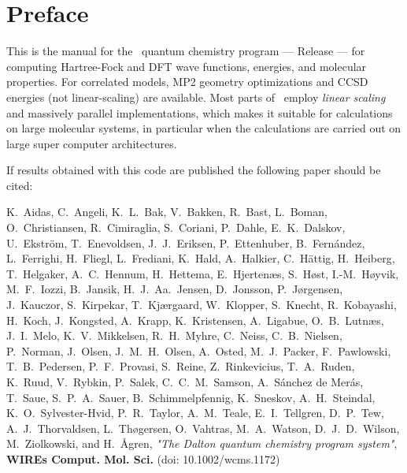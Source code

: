 
\chapter*{Preface}

This is the manual for the \lsdalton\ quantum chemistry program
--- Release {\latestrelease} --- for computing Hartree-Fock and DFT
wave functions, energies, and molecular properties.
For correlated models, 
MP2 geometry optimizations and CCSD energies (not linear-scaling) are available.
Most parts of \lsdalton\ employ {\em linear scaling} and massively parallel implementations, which makes it suitable for calculations on large molecular systems, in particular when the calculations are carried out on large super computer architectures.



If results obtained with this code are published the following paper should be cited:

\vspace{0.5 cm}

\noindent K.~Aidas, C.~Angeli, K.~L.~Bak, V.~Bakken, R.~Bast,
        L.~Boman, O.~Christiansen, R.~Cimiraglia, S.~Coriani,
        P.~Dahle, E.~K.~Dalskov, U.~Ekstr\"{o}m, T.~Enevoldsen,
        J.~J.~Eriksen, P.~Ettenhuber, B.~Fern\'{a}ndez,
        L.~Ferrighi, H.~Fliegl, L.~Frediani, K.~Hald,
        A.~Halkier, C.~H\"{a}ttig, H.~Heiberg,
        T.~Helgaker, A.~C.~Hennum, H.~Hettema,
        E.~Hjerten\ae{}s, S.~H\o{}st, I.-M.~H\o{}yvik,
        M.~F.~Iozzi, B.~Jansik, H.~J.~Aa.~Jensen,
        D.~Jonsson, P.~J\o{}rgensen, J.~Kauczor,
        S.~Kirpekar, T.~Kj\ae{}rgaard, W.~Klopper,
        S.~Knecht, R.~Kobayashi, H.~Koch, J.~Kongsted,
        A.~Krapp, K.~Kristensen, A.~Ligabue,
        O.~B.~Lutn\ae{}s, J.~I.~Melo, K.~V.~Mikkelsen, R.~H.~Myhre,
        C.~Neiss, C.~B.~Nielsen, P.~Norman,
        J.~Olsen, J.~M.~H.~Olsen, A.~Osted,
        M.~J.~Packer, F.~Pawlowski, T.~B.~Pedersen,
        P.~F.~Provasi, S.~Reine, Z.~Rinkevicius,
        T.~A.~Ruden, K.~Ruud, V.~Rybkin,
        P.~Salek, C.~C.~M.~Samson, A.~S\'{a}nchez de Mer\'{a}s,
        T.~Saue, S.~P.~A.~Sauer, B.~Schimmelpfennig,
        K.~Sneskov, A.~H.~Steindal, K.~O.~Sylvester-Hvid,
        P.~R.~Taylor, A.~M.~Teale, E.~I.~Tellgren,
        D.~P.~Tew, A.~J.~Thorvaldsen, L.~Th\o{}gersen,
        O.~Vahtras, M.~A.~Watson, D.~J.~D.~Wilson,
        M.~Ziolkowski, and H.~\AA{}gren,
\textit{"The Dalton quantum chemistry program system"}, \textbf{WIREs Comput. Mol. Sci.} (doi: 10.1002/wcms.1172)

